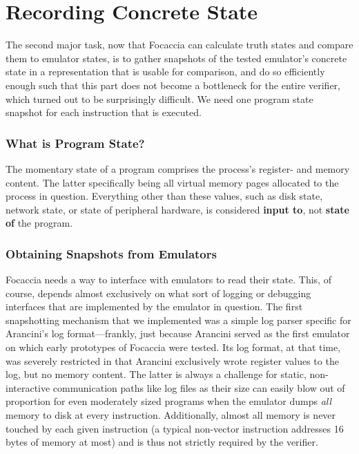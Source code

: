 \section{Recording Concrete State}

The second major task, now that Focaccia can calculate truth states and compare them to emulator states, is to gather
snapshots of the tested emulator's concrete state in a representation that is usable for comparison, and do so
efficiently enough such that this part does not become a bottleneck for the entire verifier, which turned out to be
surprisingly difficult. We need one program state snapshot for each instruction that is executed.

\subsubsection{What is Program State?}

The momentary state of a program comprises the process's register- and memory content. The latter specifically being all
virtual memory pages allocated to the process in question. Everything other than these values, such as disk state,
network state, or state of peripheral hardware, is considered \textbf{input to}, not \textbf{state of} the program.

\subsubsection{Obtaining Snapshots from Emulators}\label{sec:obtaining_snapshots}

Focaccia needs a way to interface with emulators to read their state. This, of course, depends almost exclusively on
what sort of logging or debugging interfaces that are implemented by the emulator in question. The first snapshotting
mechanism that we implemented was a simple log parser specific for Arancini's log format---frankly, just because
Arancini served as the first emulator on which early prototypes of Focaccia were tested. Its log format, at that time,
was severely restricted in that Arancini exclusively wrote register values to the log, but no memory content. The latter
is always a challenge for static, non-interactive communication paths like log files as their size can easily blow out
of proportion for even moderately sized programs when the emulator dumps \textit{all} memory to disk at every
instruction. Additionally, almost all memory is never touched by each given instruction (a typical non-vector
instruction addresses 16 bytes of memory at most) and is thus not strictly required by the verifier.

